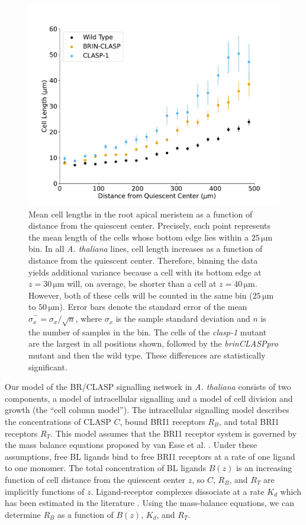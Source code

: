 \documentclass[referee,pdflatex,sn-mathphys-num]{sn-jnl}
\newcommand{\um}{\,\unit{\micro\metre}}
\begin{document}
\begin{figure}
\centering
\includegraphics[width=\textwidth]{data-binned-500.pdf}
\caption{Mean cell lengths in the root apical meristem as a function of distance from the quiescent center.
Precisely, each point represents the mean length of the cells whose bottom edge lies within a $25\um$ bin.
In all \emph{A. thaliana} lines, cell length increases as a function of distance from the quiescent center.
Therefore, binning the data yields additional variance because a cell with its bottom edge at $z = 30\um$ will, on average, be shorter than a cell at $z = 40\um$.
However, both of these cells will be counted in the same bin ($25\um$ to $50\um$).
Error bars denote the standard error of the mean $\hat{\sigma}_{x}^{-} = \sigma_{x} / \sqrt{n}$, where $\sigma_{x}$ is the sample standard deviation and $n$ is the number of samples in the bin.
The cells of the \emph{clasp-1} mutant are the largest in all positions shown, followed by the \emph{brinCLASPpro} mutant and then the wild type.
These differences are statistically significant.}
\label{data-binned}
\end{figure}

Our model of the BR/CLASP signalling network in \emph{A. thaliana} consists of two components, a model of intracellular signalling and a model of cell division and growth (the ``cell column model'').
The intracellular signalling model describes the concentrations of CLASP $C$, bound BRI1 receptors $R_{B}$, and total BRI1 receptors $R_{T}$.
This model assumes that the BRI1 receptor system is governed by the mass balance equations proposed by van Esse et al. \cite{vanesse2012}.
Under these assumptions, free BL ligands bind to free BRI1 receptors at a rate of one ligand to one monomer.
The total concentration of BL ligands $B(z)$ is an increasing function of cell distance from the quiescent center $z$, so $C$, $R_{B}$, and $R_{T}$ are implicitly functions of $z$.
Ligand-receptor complexes dissociate at a rate $K_{d}$ which has been estimated in the literature \cite{wang2001, cano-delgado2004}.
Using the mass-balance equations, we can determine $R_{B}$ as a function of $B(z)$, $K_{d}$, and $R_{T}$.
\end{document}
